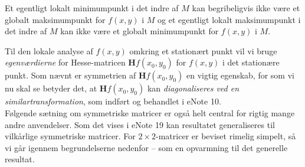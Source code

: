 \begin{think}
Et egentligt lokalt minimumpunkt i det indre af $M$ kan begribeligvis ikke være et globalt maksimumpunkt for $f(x,y)$ i $M$ og et egentligt lokalt maksimumpunkt i det indre af $M$ kan ikke være et globalt minimumpunkt for $f(x,y)$ i $M$.
\end{think}

Til den lokale analyse af  $f(x,y)$ omkring et stationært punkt vil vi bruge {\textit{egenværdierne}} for Hesse-matricen $\mathbf{H}f(x_{0}, y_{0})$ for $f(x,y)$ i det
stationære punkt. Som nævnt er symmetrien af $\mathbf{H}f(x_{0}, y_{0})$ en vigtig egenskab, for som vi nu skal se betyder det, at $\mathbf{H}f(x_{0}, y_{0})$ kan {\textit{diagonaliseres ved en similartransformation}}, som indført og behandlet i  eNote 10. \\

Følgende sætning om symmetriske matricer er også helt central for rigtig mange andre anvendelser. Som det vises i eNote 19 kan resultatet generaliseres til vilkårlige symmetriske matricer. For $2 \times 2$-matricer er beviset rimelig simpelt, så vi går igennem begrundelserne nedenfor -- som en opvarmning til det generelle resultat.

